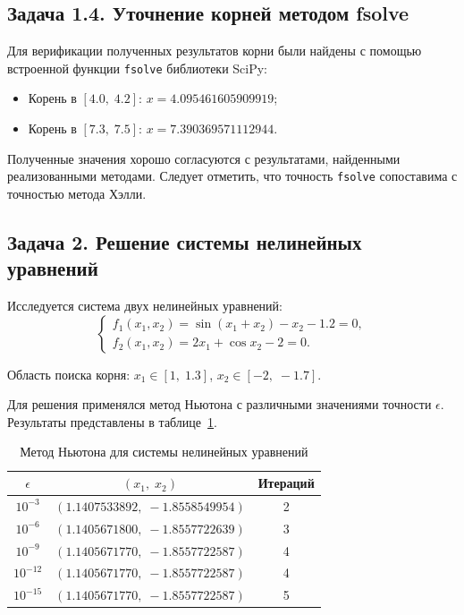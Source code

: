 \documentclass[a4paper]{article}
\begin{document}
\subsection*{Задача 1.4. Уточнение корней методом fsolve}

Для верификации полученных результатов корни были найдены с помощью встроенной функции \texttt{fsolve} библиотеки SciPy:
\begin{itemize}
    \item Корень в $[4.0,\;4.2]$: $x = 4.095461605909919$;
    \item Корень в $[7.3,\;7.5]$: $x = 7.390369571112944$.
\end{itemize}

Полученные значения хорошо согласуются с результатами, найденными реализованными методами. Следует отметить, что точность \texttt{fsolve} сопоставима с точностью метода Хэлли.

\subsection*{Задача 2. Решение системы нелинейных уравнений}

Исследуется система двух нелинейных уравнений:
\begin{equation}
\begin{cases}
f_1(x_1, x_2) = \sin(x_1 + x_2) - x_2 - 1.2 = 0,\\
f_2(x_1, x_2) = 2x_1 + \cos x_2 - 2 = 0.
\end{cases}
\end{equation}

Область поиска корня: $x_1 \in [1,\;1.3]$, $x_2 \in [-2,\;-1.7]$.

Для решения применялся метод Ньютона с различными значениями точности $\epsilon$. Результаты представлены в таблице~\ref{tab:task2}.

\begin{table}[H]
\centering
\caption{Метод Ньютона для системы нелинейных уравнений}
\label{tab:task2}
\begin{tabular}{|c|c|c|}
\hline
$\epsilon$ & $(x_1,\;x_2)$ & Итераций \\
\hline
$10^{-3}$  & $(1.1407533892,\;-1.8558549954)$ & 2 \\
$10^{-6}$  & $(1.1405671800,\;-1.8557722639)$ & 3 \\
$10^{-9}$  & $(1.1405671770,\;-1.8557722587)$ & 4 \\
$10^{-12}$ & $(1.1405671770,\;-1.8557722587)$ & 4 \\
$10^{-15}$ & $(1.1405671770,\;-1.8557722587)$ & 5 \\
\hline
\end{tabular}
\end{table}
\end{document}
